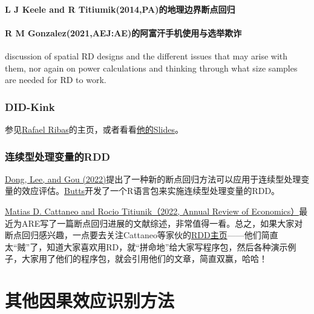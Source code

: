 \documentclass[cn,12pt,math=newtx,citestyle=gb7714-2015,bibstyle=gb7714-2015]{elegantbook}
\begin{document}
   \subsubsection{L J Keele and R Titiumik(2014,PA)的地理边界断点回归}
   
   
   
   \subsubsection{R M Gonzalez(2021,AEJ:AE)的阿富汗手机使用与选举欺诈}
	
	discussion of spatial RD designs and the different issues that may arise with them, nor again on power calculations and thinking through what size samples are needed for RD to work.
	
	
	
	\subsection{DID-Kink}
	
	参见\href{https://sites.google.com/site/r4ribas/codes}{Rafael Ribas}的主页，或者看看\href{https://www.stata.com/meeting/chicago16/slides/chicago16_ribas.pdf}{他的Slides}。
	
	
	
	\subsection{连续型处理变量的RDD}
	
	\href{http://www.yingyingdong.com/Research/RD_ContinuousTreatment.pdf}{Dong, Lee, and Gou (2022)}提出了一种新的断点回归方法可以应用于连续型处理变量的效应评估。\href{https://github.com/wenddymacro/ContinuousRD}{Butts}开发了一个R语言包来实施连续型处理变量的RDD。
	
	
	
	\href{https://rdpackages.github.io/references/Cattaneo-Titiunik_2021_ARE.pdf}{Matias D. Cattaneo and Rocio Titiunik（2022, Annual Review of Economics）}最近为ARE写了一篇断点回归进展的文献综述，非常值得一看。总之，如果大家对断点回归感兴趣，一点要去关注Cattaneo等家伙的\href{https://rdpackages.github.io/}{RDD主页}——他们简直太“贼”了，知道大家喜欢用RD，就“拼命地”给大家写程序包，然后各种演示例子，大家用了他们的程序包，就会引用他们的文章，简直双赢，哈哈！
	
	
	
	
	\chapter{其他因果效应识别方法}
	
\end{document}
